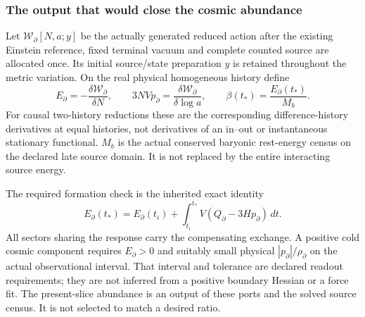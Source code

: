 \documentclass[12pt,a4paper]{article}
\begin{document}
\subsubsection{The output that would close the cosmic abundance}
Let $\mathcal W_\partial[N,a;y]$ be the actually generated reduced action
after the existing Einstein reference, fixed terminal vacuum and complete
counted source are allocated once. Its initial source/state preparation
$y$ is retained throughout the metric variation. On the real physical
homogeneous history define
\begin{equation}
\label{p9:eq:v2207-required-two-ports}
 \boxed{E_\partial=-\frac{\delta\mathcal W_\partial}{\delta N},\qquad
 3NVp_\partial=\frac{\delta\mathcal W_\partial}{\delta\log a},\qquad
 \beta(t_*)=\frac{E_\partial(t_*)}{M_b}.}
\end{equation}
For causal two-history reductions these are the corresponding
difference-history derivatives at equal histories, not derivatives of an
in--out or instantaneous stationary functional. $M_b$ is the actual
conserved baryonic rest-energy census on the declared late source domain.
It is not replaced by the entire interacting source energy.

The required formation check is the inherited exact identity
\begin{equation}
\label{p9:eq:v2207-required-formation-work}
 \boxed{E_\partial(t_*)=E_\partial(t_i)
       +\int_{t_i}^{t_*}V(Q_\partial-3Hp_\partial)\,dt.}
\end{equation}
All sectors sharing the response carry the compensating exchange.
A positive cold cosmic component requires $E_\partial>0$ and suitably
small physical $|p_\partial|/\rho_\partial$ on the actual observational
interval. That interval and tolerance are declared readout requirements;
they are not inferred from a positive boundary Hessian or a force fit.
The present-slice abundance is an output of these ports and the solved
source census. It is not selected to match a desired ratio.

\end{document}
